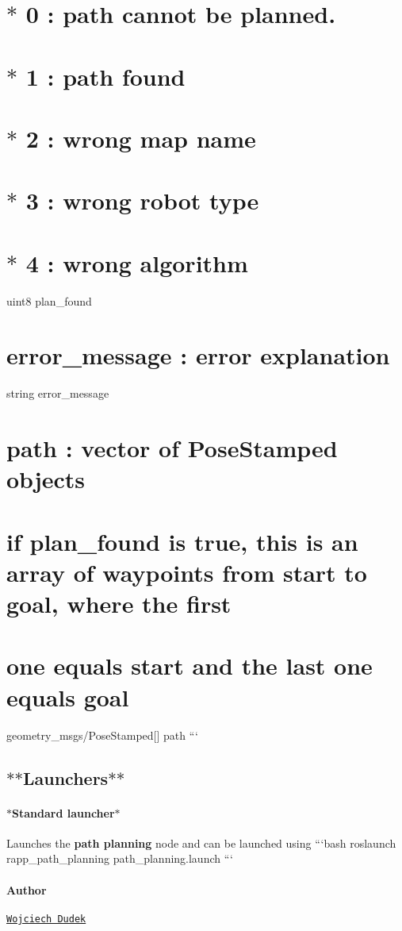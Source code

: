 \section*{$\ast$ 0 \-: path cannot be planned.}

\section*{$\ast$ 1 \-: path found}

\section*{$\ast$ 2 \-: wrong map name}

\section*{$\ast$ 3 \-: wrong robot type}

\section*{$\ast$ 4 \-: wrong algorithm}

uint8 plan\-\_\-found \section*{error\-\_\-message \-: error explanation}

string error\-\_\-message \section*{path \-: vector of Pose\-Stamped objects}

\section*{if plan\-\_\-found is true, this is an array of waypoints from start to goal, where the first}

\section*{one equals start and the last one equals goal}

geometry\-\_\-msgs/\-Pose\-Stamped\mbox{[}\mbox{]} path ```

\subsection*{$\ast$$\ast$\-Launchers$\ast$$\ast$ }

\paragraph*{$\ast$\-Standard launcher$\ast$}

Launches the {\bfseries path planning} node and can be launched using ```bash roslaunch rapp\-\_\-path\-\_\-planning path\-\_\-planning.\-launch ```

\paragraph*{Author}

\href{https://github.com/dudekw}{\tt Wojciech Dudek} 